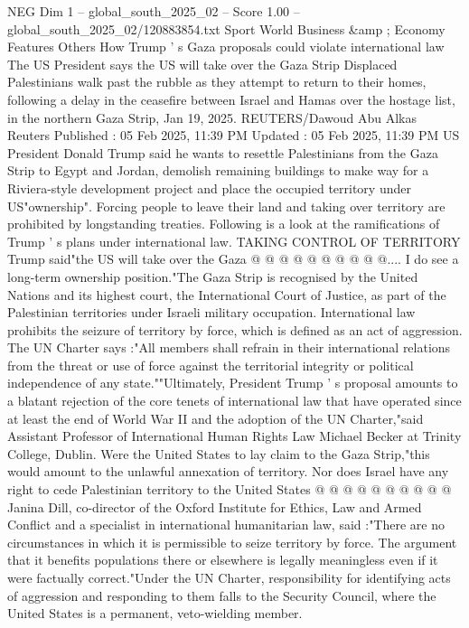 \begin{textsample}{NEG Dim 1 – global\_south\_2025\_02 – Score 1.00 – global\_south\_2025\_02/120883854.txt}  \label{ex:f1_neg_095}
Sport World Business \&amp ; Economy Features Others How Trump ' s Gaza proposals could violate international law The US President says the US will take over the Gaza Strip Displaced Palestinians walk past the rubble as they attempt to return to their homes, following a delay in the ceasefire between Israel and Hamas over the hostage list, in the northern Gaza Strip, Jan 19, 2025.
REUTERS/Dawoud Abu Alkas Reuters Published : 05 Feb 2025, 11:39 PM Updated : 05 Feb 2025, 11:39 PM US President Donald Trump said he wants to resettle Palestinians from the Gaza Strip to Egypt and Jordan, demolish remaining buildings to make way for a Riviera-style development project and place the occupied territory under US"ownership".
Forcing people to leave their land and taking over territory are prohibited by longstanding treaties.
Following is a look at the ramifications of Trump ' s plans under international law.
TAKING CONTROL OF TERRITORY Trump said"the US will take over the Gaza @ @ @ @ @ @ @ @ @ @....
I do see a long-term ownership position."The Gaza Strip is recognised by the United Nations and its highest court, the International Court of Justice, as part of the Palestinian territories under Israeli military occupation.
International law prohibits the seizure of territory by force, which is defined as an act of aggression.
The UN Charter says :"All members shall refrain in their international relations from the threat or use of force against the territorial integrity or political independence of any state.""Ultimately, President Trump ' s proposal amounts to a blatant rejection of the core tenets of international law that have operated since at least the end of World War II and the adoption of the UN Charter,"said Assistant Professor of International Human Rights Law Michael Becker at Trinity College, Dublin.
Were the United States to lay claim to the Gaza Strip,"this would amount to the unlawful annexation of territory.
Nor does Israel have any right to cede Palestinian territory to the United States @ @ @ @ @ @ @ @ @ @ Janina Dill, co-director of the Oxford Institute for Ethics, Law and Armed Conflict and a specialist in international humanitarian law, said :"There are no circumstances in which it is permissible to seize territory by force.
The argument that it benefits populations there or elsewhere is legally meaningless even if it were factually correct."Under the UN Charter, responsibility for identifying acts of aggression and responding to them falls to the Security Council, where the United States is a permanent, veto-wielding member.

\end{textsample}
